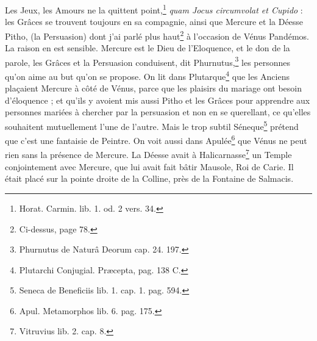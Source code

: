 \documentclass[a4paper, 11pt, oneside, polutonikogreek, french]{article}
\begin{document}
Les Jeux, les Amours ne la quittent point,\footnote{Horat. Carmin. lib. 1. od. 2 vers. 34.} \emph{quam Jocus circumvolat et Cupido} : les Grâces se trouvent toujours en sa compagnie, ainsi que Mercure et la Déesse Pitho, (la Persuasion) dont j'ai parlé plus haut\footnote{Ci-dessus, page 78.} à l'occasion de Vénus Pandémos. La raison en est sensible. Mercure est le Dieu de l'Eloquence, et le don de la parole, les Grâces et la Persuasion conduisent, dit Phurnutus,\footnote{Phurnutus de Naturâ Deorum cap. 24. 197.} les personnes qu'on aime au but qu'on se propose. On lit dans Plutarque\footnote{Plutarchi Conjugial. Præcepta, pag. 138 C.} que les Anciens plaçaient Mercure à côté de Vénus, parce que les plaisirs du mariage ont besoin d'éloquence ; et qu'ils y avoient mis aussi Pitho et les Grâces pour apprendre aux personnes mariées à chercher par la persuasion et non en se querellant, ce qu'elles souhaitent mutuellement l'une de l'autre. Mais le trop subtil Séneque\footnote{Seneca de Beneficiis lib. 1. cap. 1. pag. 594.} prétend que c'est une fantaisie de Peintre. On voit aussi dans Apulée\footnote{Apul. Metamorphos lib. 6. pag. 175.} que Vénus ne peut rien sans la présence de Mercure. La Déesse avait à Halicarnasse\footnote{Vitruvius lib. 2. cap. 8.} un Temple conjointement avec Mercure, que lui avait fait bâtir Mausole, Roi de Carie. Il était placé sur la pointe droite de la Colline, près de la Fontaine de Salmacis.
\end{document}
